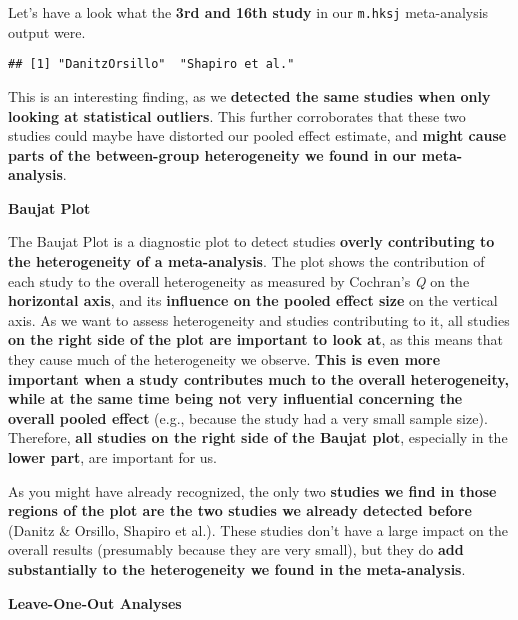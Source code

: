 \documentclass[]{book}
\newenvironment{Shaded}{\begin{snugshade}}{\end{snugshade}}
\newcommand{\KeywordTok}[1]{\textcolor[rgb]{0.13,0.29,0.53}{\textbf{#1}}}
\newcommand{\DecValTok}[1]{\textcolor[rgb]{0.00,0.00,0.81}{#1}}
\newcommand{\OperatorTok}[1]{\textcolor[rgb]{0.81,0.36,0.00}{\textbf{#1}}}
\newcommand{\NormalTok}[1]{#1}
\theoremstyle{definition}
\theoremstyle{definition}
\theoremstyle{definition}
\theoremstyle{remark}
\begin{document}
Let's have a look what the \textbf{3rd and 16th study} in our
\texttt{m.hksj} meta-analysis output were.

\begin{Shaded}
\end{Shaded}

\begin{verbatim}
## [1] "DanitzOrsillo"  "Shapiro et al."
\end{verbatim}

This is an interesting finding, as we \textbf{detected the same studies
when only looking at statistical outliers}. This further corroborates
that these two studies could maybe have distorted our pooled effect
estimate, and \textbf{might cause parts of the between-group
heterogeneity we found in our meta-analysis}.

\textbf{Baujat Plot}

The Baujat Plot \citep{baujat2002graphical} is a diagnostic plot to
detect studies \textbf{overly contributing to the heterogeneity of a
meta-analysis}. The plot shows the contribution of each study to the
overall heterogeneity as measured by Cochran's \emph{Q} on the
\textbf{horizontal axis}, and its \textbf{influence on the pooled effect
size} on the vertical axis. As we want to assess heterogeneity and
studies contributing to it, all studies \textbf{on the right side of the
plot are important to look at}, as this means that they cause much of
the heterogeneity we observe. \textbf{This is even more important when a
study contributes much to the overall heterogeneity, while at the same
time being not very influential concerning the overall pooled effect}
(e.g., because the study had a very small sample size). Therefore,
\textbf{all studies on the right side of the Baujat plot}, especially in
the \textbf{lower part}, are important for us.

As you might have already recognized, the only two \textbf{studies we
find in those regions of the plot are the two studies we already
detected before} (Danitz \& Orsillo, Shapiro et al.). These studies
don't have a large impact on the overall results (presumably because
they are very small), but they do \textbf{add substantially to the
heterogeneity we found in the meta-analysis}.

\textbf{Leave-One-Out Analyses}
\end{document}
